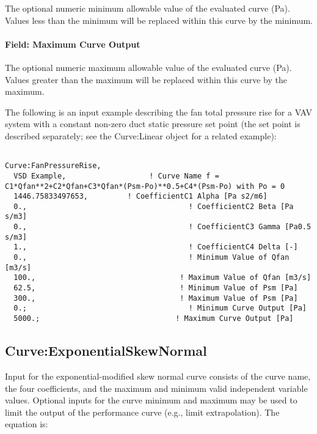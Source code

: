 The optional numeric minimum allowable value of the evaluated curve (Pa). Values less than the minimum will be replaced within this curve by the minimum.

\paragraph{Field: Maximum Curve Output}\label{field-maximum-curve-output-10}

The optional numeric maximum allowable value of the evaluated curve (Pa). Values greater than the maximum will be replaced within this curve by the maximum.

The following is an input example describing the fan total pressure rise for a VAV system with a constant non-zero duct static pressure set point (the set point is described separately; see the Curve:Linear object for a related example):

\begin{lstlisting}

Curve:FanPressureRise,
  VSD Example,                   ! Curve Name f = C1*Qfan**2+C2*Qfan+C3*Qfan*(Psm-Po)**0.5+C4*(Psm-Po) with Po = 0
  1446.75833497653,         ! CoefficientC1 Alpha [Pa s2/m6]
  0.,                                     ! CoefficientC2 Beta [Pa s/m3]
  0.,                                     ! CoefficientC3 Gamma [Pa0.5 s/m3]
  1.,                                     ! CoefficientC4 Delta [-]
  0.,                                     ! Minimum Value of Qfan [m3/s]
  100.,                                 ! Maximum Value of Qfan [m3/s]
  62.5,                                 ! Minimum Value of Psm [Pa]
  300.,                                 ! Maximum Value of Psm [Pa]
  0.;                                     ! Minimum Curve Output [Pa]
  5000.;                               ! Maximum Curve Output [Pa]
\end{lstlisting}

\subsection{Curve:ExponentialSkewNormal}\label{curveexponentialskewnormal}

Input for the exponential-modified skew normal curve consists of the curve name, the four coefficients, and the maximum and minimum valid independent variable values. Optional inputs for the curve minimum and maximum may be used to limit the output of the performance curve (e.g., limit extrapolation). The equation is:

